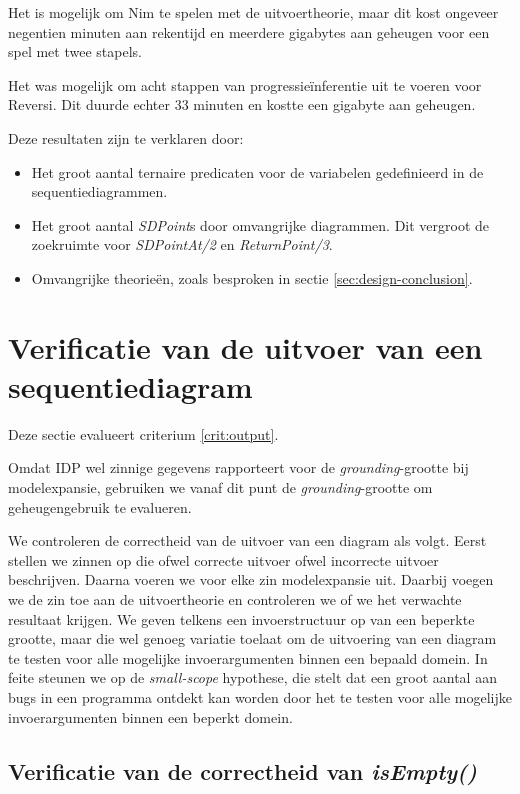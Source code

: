 Het is mogelijk om Nim te spelen met de uitvoertheorie, maar dit kost ongeveer negentien minuten aan rekentijd en meerdere gigabytes aan geheugen voor een spel met twee stapels.

Het was mogelijk om acht stappen van progressie\"inferentie uit te voeren voor Reversi. Dit duurde echter 33 minuten en kostte een gigabyte aan geheugen.

Deze resultaten zijn te verklaren door:

\begin{itemize}
	\item Het groot aantal ternaire predicaten voor de variabelen gedefinieerd in de sequentiediagrammen.
	\item Het groot aantal \textit{SDPoint}s door omvangrijke diagrammen. Dit vergroot de zoekruimte voor \textit{SDPointAt/2} en \textit{ReturnPoint/3}.
	\item Omvangrijke theorie\"en, zoals besproken in sectie \ref{sec:design-conclusion}.
\end{itemize}

\section{Verificatie van de uitvoer van een sequentiediagram}\label{sec:verify-output}

Deze sectie evalueert criterium \ref{crit:output}.

Omdat IDP wel zinnige gegevens rapporteert voor de \textit{grounding}-grootte bij modelexpansie, gebruiken we vanaf dit punt de \textit{grounding}-grootte om geheugengebruik te evalueren.

We controleren de correctheid van de uitvoer van een diagram als volgt. Eerst stellen we zinnen op die ofwel correcte uitvoer ofwel incorrecte uitvoer beschrijven. Daarna voeren we voor elke zin modelexpansie uit. Daarbij voegen we de zin toe aan de uitvoertheorie en controleren we of we het verwachte resultaat krijgen. We geven telkens een invoerstructuur op van een beperkte grootte, maar die wel genoeg variatie toelaat om de uitvoering van een diagram te testen voor alle mogelijke invoerargumenten binnen een bepaald domein. In feite steunen we op de \textit{small-scope} hypothese\cite{andoni2003evaluating}, die stelt dat een groot aantal aan bugs in een programma ontdekt kan worden door het te testen voor alle mogelijke invoerargumenten binnen een beperkt domein.

\subsection{Verificatie van de correctheid van \textit{isEmpty()}}

